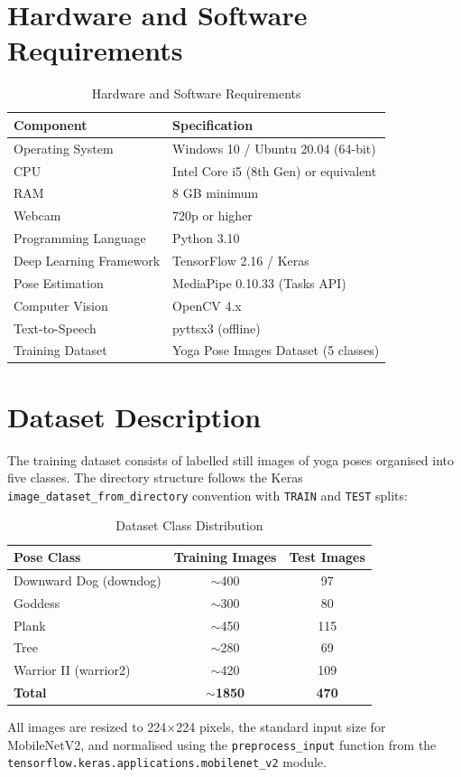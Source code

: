 \section{Hardware and Software Requirements}
\begin{table}[H]
    \centering
    \caption{Hardware and Software Requirements}
    \begin{tabular}{|l|l|}
        \hline
        \textbf{Component} & \textbf{Specification} \\
        \hline
        Operating System & Windows 10 / Ubuntu 20.04 (64-bit) \\
        \hline
        CPU & Intel Core i5 (8th Gen) or equivalent \\
        \hline
        RAM & 8 GB minimum \\
        \hline
        Webcam & 720p or higher \\
        \hline
        Programming Language & Python 3.10 \\
        \hline
        Deep Learning Framework & TensorFlow 2.16 / Keras \\
        \hline
        Pose Estimation & MediaPipe 0.10.33 (Tasks API) \\
        \hline
        Computer Vision & OpenCV 4.x \\
        \hline
        Text-to-Speech & pyttsx3 (offline) \\
        \hline
        Training Dataset & Yoga Pose Images Dataset (5 classes) \\
        \hline
    \end{tabular}
    \label{tab:requirements}
\end{table}

\section{Dataset Description}
The training dataset consists of labelled still images of yoga poses organised into five classes. The directory structure follows the Keras \texttt{image\_dataset\_from\_directory} convention with \texttt{TRAIN} and \texttt{TEST} splits:

\begin{table}[H]
    \centering
    \caption{Dataset Class Distribution}
    \begin{tabular}{|l|c|c|}
        \hline
        \textbf{Pose Class} & \textbf{Training Images} & \textbf{Test Images} \\
        \hline
        Downward Dog (downdog) & $\sim$400 & 97 \\
        \hline
        Goddess & $\sim$300 & 80 \\
        \hline
        Plank & $\sim$450 & 115 \\
        \hline
        Tree & $\sim$280 & 69 \\
        \hline
        Warrior II (warrior2) & $\sim$420 & 109 \\
        \hline
        \textbf{Total} & \textbf{$\sim$1850} & \textbf{470} \\
        \hline
    \end{tabular}
    \label{tab:dataset}
\end{table}

All images are resized to 224$\times$224 pixels, the standard input size for MobileNetV2, and normalised using the \texttt{preprocess\_input} function from the \texttt{tensorflow.keras.applications.mobilenet\_v2} module.
